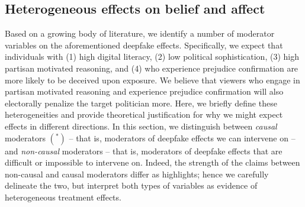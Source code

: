 \documentclass[12pt,letterpaper]{article}
\begin{document}




\subsection{Heterogeneous effects on belief and affect}

Based on a growing body of literature, we identify a number of moderator variables on the aforementioned deepfake effects. Specifically, we expect that individuals with (1) high digital literacy, (2) low political sophistication, (3) high partisan motivated reasoning, and (4) who experience prejudice confirmation are more likely to be deceived upon exposure. We believe that viewers who engage in partisan motivated reasoning and experience prejudice confirmation will also electorally penalize the target politician more. Here, we briefly define these heterogeneities and provide theoretical justification for why we might expect effects in different directions. In this section, we distinguish between \textit{causal} moderators $(^{*})$ -- that is, moderators of deepfake effects we can intervene on -- and \textit{non-causal} moderators -- that is, moderators of deepfake effects that are difficult or impossible to intervene on. Indeed, the strength of the claims between non-causal and causal moderators differ as \cite{bansak2017generalized} highlights; hence we carefully delineate the two, but interpret both types of variables as evidence of heterogeneous treatment effects.
\end{document}
